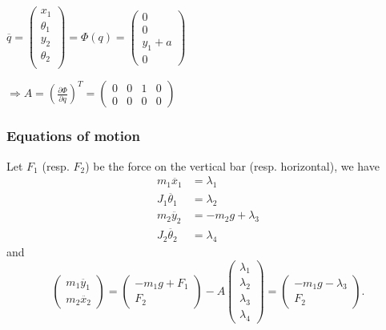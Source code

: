 $\overline{q} = \left( \begin{array}{c}
x_1\\
\theta_1\\
y_2\\
\theta_2\\
\end{array} \right) = \Phi(q) = \left( \begin{array}{c}
0\\
0\\
y_1 + a\\
0
\end{array} \right)$

$ \Rightarrow A = (\frac{\partial \Phi}{\partial q})^T = \left( \begin{array}{cccc}
0 & 0 & 1 & 0\\
0 & 0 & 0 & 0
\end{array} \right)$

\subsubsection{Equations of motion}
Let $F_1$ (resp. $F_2$) be the force on the vertical bar (resp. horizontal), we have
\begin{align*}
m_1\ddot{x_1} &= \lambda_1\\
J_1\ddot{\theta_1} &= \lambda_2\\
m_2\ddot{y_2} &= -m_2g + \lambda_3\\
J_2\ddot{\theta_2} &= \lambda_4
\end{align*}
and
$$ \left( \begin{array}{c} 
m_1\ddot{y_1} \\
m_2\ddot{x_2} 
\end{array} \right) 
=  \left( \begin{array}{c} 
-m_1g + F_1\\
F_2
\end{array} \right) - A  \left( \begin{array}{c} 
\lambda_1\\
\lambda_2\\
\lambda_3\\
\lambda_4
\end{array} \right)
= \left( \begin{array}{c} 
-m_1g-\lambda_3\\
F_2
\end{array} \right).$$


